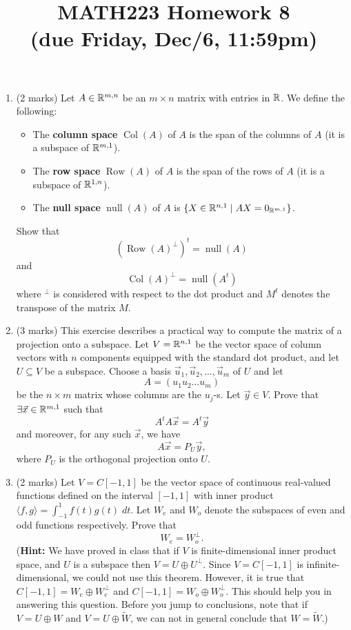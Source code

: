 \documentclass[12pt]{article}
\begin{document}
\title{MATH223 Homework 8\\ (due Friday, Dec/6, 11:59pm)}
\author{}
\date{}
\maketitle
{}

\begin{enumerate}
\item (2 marks) Let $A\in\mathbb{R}^{m,n}$ be an $m\times n$ matrix with entries in $\mathbb{R}$. We define the following:
  \begin{itemize}
  \item The \textbf{column space} $\operatorname{Col}(A)$ of $A$ is the span of the columns of $A$ (it is a subspace of $\mathbb{R}^{m,1}$).
  \item The \textbf{row space} $\operatorname{Row}(A)$ of $A$ is the span of the rows of $A$ (it is a subspace of $\mathbb{R}^{1,n}$).
  \item The \textbf{null space} $\operatorname{null}(A)$ of $A$ is $\{ X\in \mathbb{R}^{n,1} \; |\; AX=0_{\mathbb{R}^{m,1}} \}$.
  \end{itemize}
  Show that
  \[
    \left(\operatorname{Row}(A)^\perp\right)^t=\operatorname{null}(A)
  \]
  and
  \[
    \operatorname{Col}(A)^\perp=\operatorname{null}(A^t)
  \]
  where ${}^\perp$ is considered with respect to the dot product and $M^t$ denotes the transpose of the matrix $M$.
\item (3 marks) This exercise describes a practical way to compute the matrix of a projection onto a subspace. Let $V=\mathbb{R}^{n,1}$ be the vector space of column vectors with $n$ components equipped with the standard dot product, and let $U\subseteq V$ be a subspace. Choose a basis $\vec u_1,\vec u_2,\ldots ,\vec u_m$ of $U$ and let
  \[
    A=( u_1 u_2 \ldots u_m)
  \]
  be the $n\times m$ matrix whose columns are the $u_j$-s. Let $\vec y\in V$. Prove that $\exists \vec x\in \mathbb{R}^{m,1}$ such that
  \[
    A^tA\vec x =A^t\vec y
  \]
  and moreover, for any such $\vec x$, we have
  \[
    A\vec x=P_U\vec y,
  \]
  where $P_U$ is the orthogonal projection onto $U$.
\item (2 marks) Let $V=C[-1,1]$ be the vector space of continuous real-valued functions defined on the interval $[-1,1]$ with inner product $\langle f,g\rangle = \int_{-1}^1 f(t)g(t) \; dt$. Let $W_e$ and $W_o$ denote the subspaces of even and odd functions respectively. Prove that
  \[
    W_e=W_o^\perp.
  \]
  (\textbf{Hint:} We have proved in class that if $V$ is finite-dimensional inner product space, and $U$ is a subspace then $V=U\oplus U^\perp$. Since $V=C[-1,1]$ is infinite-dimensional, we could not use this theorem. However, it is true that $C[-1,1]=W_e\oplus W_e^\perp$ and $C[-1,1]=W_o\oplus W_o^\perp$. This should help you in answering this question. Before you jump to conclusions, note that if $V=U\oplus W$ and $V=U\oplus\widetilde{W}$, we can not in general conclude that $W=\widetilde{W}$.)

\end{enumerate}
\end{document}

